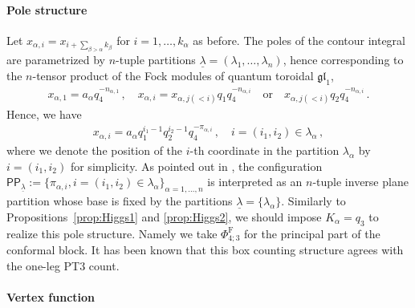 \paragraph{Pole structure}
Let $x_{\alpha,i} = x_{i+\sum_{\beta > \alpha}k_\beta}$ for $i = 1,\ldots, k_\alpha$ as before.
The poles of the contour integral are parametrized by $n$-tuple partitions $\underline{\lambda} = (\lambda_1,\ldots,\lambda_n)$, hence corresponding to the $n$-tensor product of the Fock modules of quantum toroidal $\mathfrak{gl}_1$,
\begin{align}
 x_{\alpha,1} = a_\alpha q_4^{-n_{\alpha,1}} 
 \, , \quad 
 x_{\alpha,i} = 
 x_{\alpha,j(<i)} q_{1} q_4^{-n_{\alpha,i}} 
 \quad \text{or} \quad 
 x_{\alpha,j(<i)} q_{2} q_4^{-n_{\alpha,i}} 
 \, .
\end{align} 
Hence, we have
\begin{align}
 x_{\alpha,i} = a_\alpha q_1^{i_1-1} q_2^{i_2-1} q_4^{-\pi_{\alpha,i}} 
 \, , \quad 
 i = (i_1,i_2) \in \lambda_\alpha \, ,
    \label{eq:poles_PT1}
\end{align} 
where we denote the position of the $i$-th coordinate in the partition $\lambda_\alpha$ by $i = (i_1, i_2)$ for simplicity.
As pointed out in \cite{Crew:2020psc}, the configuration $\mathsf{PP}_{\underline{\lambda}} := \{ \pi_{\alpha,i}, i = (i_1,i_2) \in \lambda_\alpha \}_{\alpha = 1,\ldots,n}$ is interpreted as an $n$-tuple inverse plane partition whose base is fixed by the partitions $\underline{\lambda} = \{\lambda_\alpha\}$.
Similarly to Propositions~\ref{prop:Higgs1} and \ref{prop:Higgs2}, we should impose $K_\alpha = q_3$ to realize this pole structure.
Namely we take $\Phi_{4;3}^\text{F}$ for the principal part of the conformal block.
It has been known that this box counting structure agrees with the one-leg PT3 count.


\paragraph{Vertex function}

